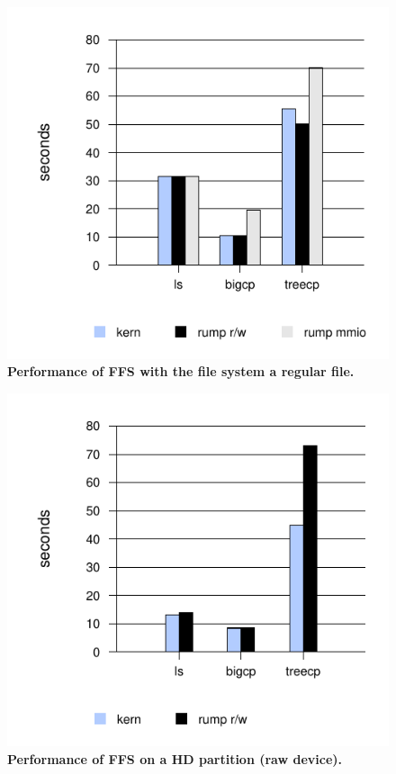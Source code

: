 \begin{figure}
\includegraphics{ffsimg}
\caption[Performance of FFS with the file system a regular file]{
\textbf{Performance of FFS with the file system a regular file.}
}
\label{fig:ffsimg}
\end{figure}
\begin{figure}
\includegraphics{ffsdev}
\caption[Performance of FFS on a HD partition (raw device)]{
\textbf{Performance of FFS on a HD partition (raw device).}
}
\label{fig:ffsdev}
\end{figure}

